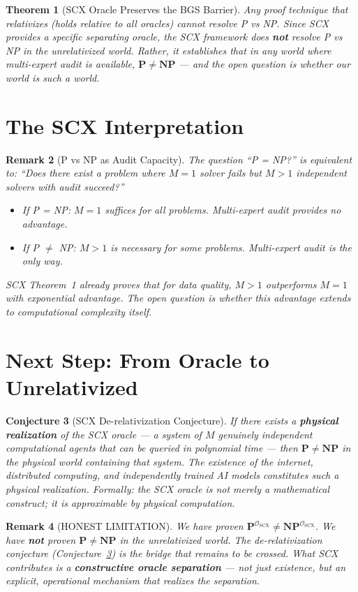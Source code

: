 \documentclass[11pt,a4paper]{article}
\newtheorem{theorem}{Theorem}[section]
\newtheorem{conjecture}[theorem]{Conjecture}
\newtheorem{remark}[theorem]{Remark}
\newcommand{\NP}{\mathbf{NP}}
\newcommand{\PP}{\mathbf{P}}
\begin{document}
\begin{theorem}[SCX Oracle Preserves the BGS Barrier]
\label{thm:bgs-barrier}
Any proof technique that relativizes (holds relative to all oracles) cannot resolve P vs NP. Since SCX provides a specific separating oracle, the SCX framework does \textbf{not} resolve P vs NP in the unrelativized world. Rather, it establishes that in any world where multi-expert audit is available, $\PP \neq \NP$ — and the open question is whether our world is such a world.
\end{theorem}

\section{The SCX Interpretation}

\begin{remark}[P vs NP as Audit Capacity]
The question ``P = NP?'' is equivalent to: ``Does there exist a problem where $M=1$ solver fails but $M>1$ independent solvers with audit succeed?''

\begin{itemize}[nosep]
    \item If P = NP: $M=1$ suffices for all problems. Multi-expert audit provides no advantage.
    \item If P $\neq$ NP: $M>1$ is necessary for some problems. Multi-expert audit is the only way.
\end{itemize}

SCX Theorem~1 already proves that for data quality, $M>1$ outperforms $M=1$ with exponential advantage. The open question is whether this advantage extends to computational complexity itself.
\end{remark}

\section{Next Step: From Oracle to Unrelativized}

\begin{conjecture}[SCX De-relativization Conjecture]
\label{conj:derelativize}
If there exists a \textbf{physical realization} of the SCX oracle — a system of $M$ genuinely independent computational agents that can be queried in polynomial time — then $\PP \neq \NP$ in the physical world containing that system. The existence of the internet, distributed computing, and independently trained AI models constitutes such a physical realization. Formally: the SCX oracle is not merely a mathematical construct; it is approximable by physical computation.
\end{conjecture}

\begin{remark}[HONEST LIMITATION]
We have proven $\PP^{\mathcal{O}_{\text{SCX}}} \neq \NP^{\mathcal{O}_{\text{SCX}}}$. We have \textbf{not} proven $\PP \neq \NP$ in the unrelativized world. The de-relativization conjecture (Conjecture~\ref{conj:derelativize}) is the bridge that remains to be crossed. What SCX contributes is a \textbf{constructive oracle separation} — not just existence, but an explicit, operational mechanism that realizes the separation.
\end{remark}
\end{document}
